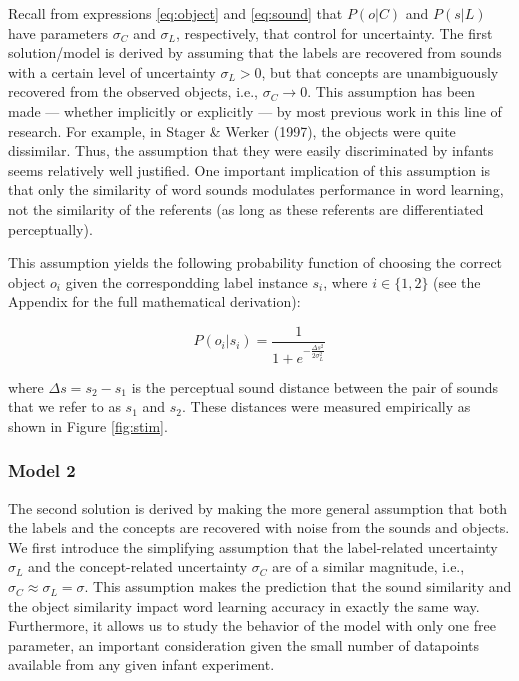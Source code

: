 \documentclass[english,,man]{apa6}
\begin{document}
Recall from expressions \ref{eq:object} and \ref{eq:sound} that \(P(o|C)\) and \(P(s|L)\) have parameters \(\sigma_C\) and \(\sigma_L\), respectively, that control for uncertainty. The first solution/model is derived by assuming that the labels are recovered from sounds with a certain level of uncertainty \(\sigma_L > 0\), but that concepts are unambiguously recovered from the observed objects, i.e., \(\sigma_C \rightarrow 0\). This assumption has been made --- whether implicitly or explicitly --- by most previous work in this line of research. For example, in Stager \& Werker (1997), the objects were quite dissimilar. Thus, the assumption that they were easily discriminated by infants seems relatively well justified. One important implication of this assumption is that only the similarity of word sounds modulates performance in word learning, not the similarity of the referents (as long as these referents are differentiated perceptually).

This assumption yields the following probability function of choosing the correct object \(o_i\) given the correspondding label instance \(s_i\), where \(i \in \{1,2\}\) (see the Appendix for the full mathematical derivation):

\begin{equation} \label{eq:model1}
P(o_i|s_i)= \frac{1}{1 + e^{-\frac{\Delta s^2}{2\sigma_L^2}}}
\end{equation}

where \(\Delta s = s_2-s_1\) is the perceptual sound distance between the pair of sounds that we refer to as \(s_1\) and \(s_2\). These distances were measured empirically as shown in Figure \ref{fig:stim}.

\hypertarget{model-2}{%
\subsubsection{Model 2}\label{model-2}}

The second solution is derived by making the more general assumption that both the labels and the concepts are recovered with noise from the sounds and objects. We first introduce the simplifying assumption that the label-related uncertainty \(\sigma_L\) and the concept-related uncertainty \(\sigma_C\) are of a similar magnitude, i.e., \(\sigma_C \approx \sigma_L = \sigma\). This assumption makes the prediction that the sound similarity and the object similarity impact word learning accuracy in exactly the same way. Furthermore, it allows us to study the behavior of the model with only one free parameter, an important consideration given the small number of datapoints available from any given infant experiment.
\end{document}

